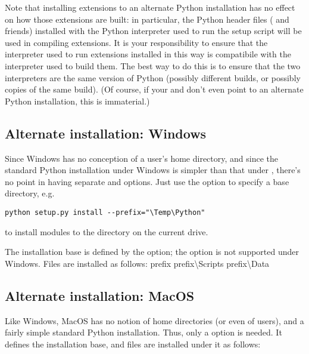 \documentclass{howto}
\begin{document}
Note that installing extensions to an alternate Python installation has
no effect on how those extensions are built: in particular, the Python
header files ( and friends) installed with the Python
interpreter used to run the setup script will be used in compiling
extensions.  It is your responsibility to ensure that the interpreter
used to run extensions installed in this way is compatibile with the
interpreter used to build them.  The best way to do this is to ensure
that the two interpreters are the same version of Python (possibly
different builds, or possibly copies of the same build).  (Of course, if
your  and  don't even
point to an alternate Python installation, this is immaterial.)


\subsection{Alternate installation: Windows}
\label{alt-install-windows}

Since Windows has no conception of a user's home directory, and since
the standard Python installation under Windows is simpler than that
under \UNIX, there's no point in having separate 
and  options.  Just use the 
option to specify a base directory, e.g.
\begin{verbatim}
python setup.py install --prefix="\Temp\Python"
\end{verbatim}
to install modules to the  directory on the current
drive.

The installation base is defined by the  option;
the  option is not supported under Windows.
Files are installed as follows:
              {prefix}{}
              {prefix}{\textbackslash{}Scripts}
              {prefix}{\textbackslash{}Data}


\subsection{Alternate installation: MacOS}
\label{alt-install-macos}

Like Windows, MacOS has no notion of home directories (or even of
users), and a fairly simple standard Python installation.  Thus, only a
 option is needed.  It defines the installation
base, and files are installed under it as follows:
\end{document}
